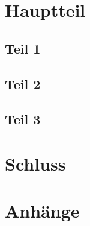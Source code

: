 \documentclass[12pt,titlepage,ngerman]{article}
\begin{document}
\section{Hauptteil}
\subsection{Teil 1}
\subsection{Teil 2}
\subsection{Teil 3}
\newpage
\section{Schluss}

\newpage
{}
\printbibliography
\newpage

\section*{Anhänge}
\end{document}
